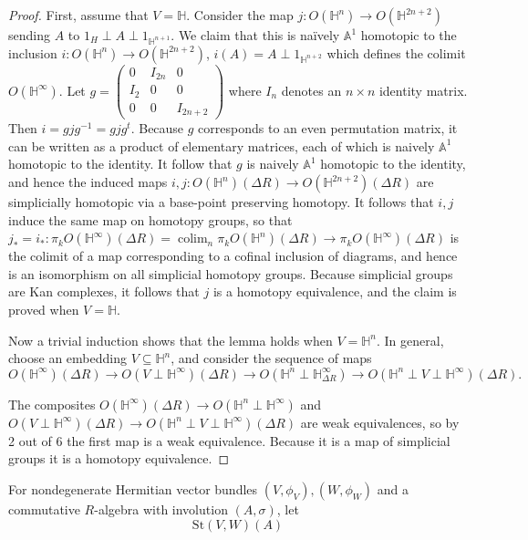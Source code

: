 \documentclass[edeposit,fullpage]{uiucthesis2009}
\newcommand{\mbb}{\mathbb}
\newcommand{\St}{\mathrm{St}}
\DeclareMathOperator*{\colim}{colim}
\theoremstyle{plain}
\numberwithin{lemma}{section}
\theoremstyle{definition}
\begin{document}
\begin{proof}
First, assume that $V = \mbb H$. Consider the map $j : O(\mbb H^n)
\rightarrow O(\mbb H^{2n+2})$ sending $A$ to $1_H \perp A \perp
1_{\mbb H^{n+1}}$. We claim that this is na\"ively $\mbb A^1$ homotopic
to the inclusion $i : O(\mbb H^n) \rightarrow O(\mbb H^{2n+2})$, $i(A)
= A \perp 1_{\mbb H^{n+2}}$ which defines the colimit $O(\mbb
H^\infty)$. Let $g = \begin{pmatrix}
0 & I_{2n} & 0 \\
I_2 & 0 & 0 \\
0 & 0 & I_{2n+2}
\end{pmatrix}$ where $I_n$ denotes an $n \times n$ identity
matrix. Then $i = gjg^{-1} = gjg^t$. Because $g$ corresponds to an
even permutation matrix, it can be written as a product of elementary
matrices, each of which is naively $\mbb A^1$ homotopic to the
identity. It follow that $g$ is naively $\mbb A^1$ homotopic to the
identity, and hence the induced maps $i,j : O(\mbb H^n)(\Delta R)
\rightarrow O(\mbb H^{2n+2})(\Delta R)$ are simplicially homotopic
via a base-point preserving homotopy. It follows that $i,j$ induce the
same map on homotopy groups, so that $j_* = i_*: \pi_kO(\mbb
H^\infty)(\Delta R) = \colim_n \pi_k O(\mbb H^n)(\Delta R)
\rightarrow \pi_k O(\mbb H^\infty)(\Delta R)$ is the colimit of a map
corresponding to a cofinal inclusion of diagrams, and hence is an
isomorphism on all simplicial homotopy groups. Because simplicial
groups are Kan complexes, it follows that $j$ is a homotopy
equivalence, and the claim is proved when $V = \mbb H$.

Now a trivial induction shows that the lemma holds when $V = \mbb
H^n$. In general, choose an embedding $V \subseteq \mbb H^n$, and
consider the sequence of maps
\[
O(\mbb H^\infty)(\Delta R) \rightarrow O(V \perp \mbb
H^\infty)(\Delta R) \rightarrow O(\mbb H^n \perp \mbb H_{\Delta R}^\infty)
\rightarrow O(\mbb H^n \perp V \perp \mbb H^\infty)(\Delta R).
\]

The composites $O(\mbb H^\infty)(\Delta R) \rightarrow O(\mbb H^n
\perp \mbb H^\infty)$ and $O(V \perp \mbb
H^\infty)(\Delta R) \rightarrow O(\mbb H^n \perp V \perp \mbb
H^\infty)(\Delta R)$ are weak equivalences, so by 2 out of 6 the
first map is a weak equivalence. Because it is a map of simplicial
groups it is a homotopy equivalence. 
 
\end{proof}

For nondegenerate Hermitian vector bundles $(V,\phi_V), (W,\phi_W)$ and a commutative
$R$-algebra with involution $(A,\sigma)$, let
\[
\St(V,W)(A)
\]
\end{document}
